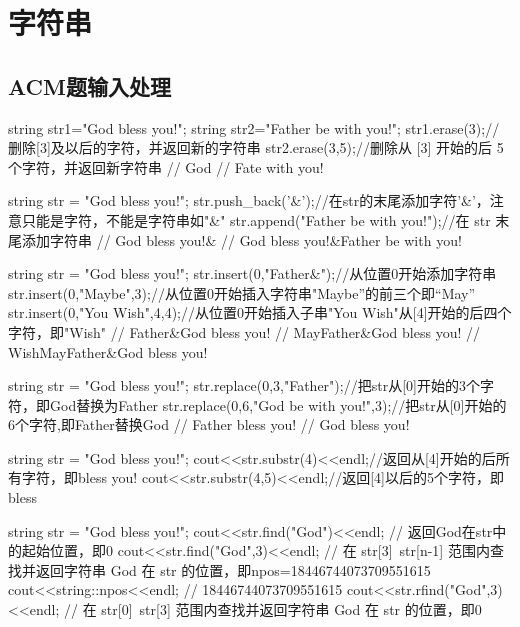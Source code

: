 \chapter{字符串}

\section{ACM题输入处理}

\begin{NoteCode}
string str1="God bless you!";
string str2="Father be with you!";
str1.erase(3);//删除[3]及以后的字符，并返回新的字符串
str2.erase(3,5);//删除从 [3] 开始的后 5 个字符，并返回新字符串
// God
// Fate with you!
\end{NoteCode}

\begin{NoteCode}
string str = "God bless you!";
str.push_back('&');//在str的末尾添加字符'&'，注意只能是字符，不能是字符串如"&"
str.append("Father be with you!");//在 str 末尾添加字符串
// God bless you!&
// God bless you!&Father be with you!
\end{NoteCode}

\begin{NoteCode}
string str = "God bless you!";
str.insert(0,"Father&");//从位置0开始添加字符串
str.insert(0,"Maybe",3);//从位置0开始插入字符串"Maybe”的前三个即“May”
str.insert(0,"You Wish",4,4);//从位置0开始插入子串"You Wish"从[4]开始的后四个字符，即"Wish"
// Father&God bless you!
// MayFather&God bless you!
// WishMayFather&God bless you!
\end{NoteCode}

\begin{NoteCode}
string str = "God bless you!";
str.replace(0,3,"Father");//把str从[0]开始的3个字符，即God替换为Father
str.replace(0,6,"God be with you!",3);//把str从[0]开始的6个字符,即Father替换God
// Father bless you!
// God bless you!
\end{NoteCode}


\begin{NoteCode}
string str = "God bless you!";
cout<<str.substr(4)<<endl;//返回从[4]开始的后所有字符，即bless you!
cout<<str.substr(4,5)<<endl;//返回[4]以后的5个字符，即bless
\end{NoteCode}

\begin{NoteCode}
string str = "God bless you!";
cout<<str.find("God")<<endl; // 返回God在str中的起始位置，即0
cout<<str.find("God",3)<<endl; // 在 str[3]~str[n-1] 范围内查找并返回字符串 God 在 str 的位置，即npos=18446744073709551615
cout<<string::npos<<endl; // 18446744073709551615
cout<<str.rfind("God",3)<<endl; // 在 str[0]~str[3] 范围内查找并返回字符串 God 在 str 的位置，即0
\end{NoteCode}

